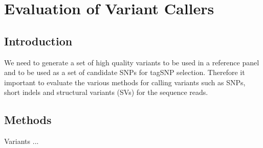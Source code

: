\section{Evaluation of Variant Callers}
\subsection{Introduction}
We need to generate a set of high quality variants to be used in a reference panel and to be used as a set of candidate SNPs for tagSNP selection. Therefore it important to evaluate the various methods for calling variants such as SNPs, short indels and structural variants (SVs) for the sequence reads.
\subsection{Methods}
Variants ...